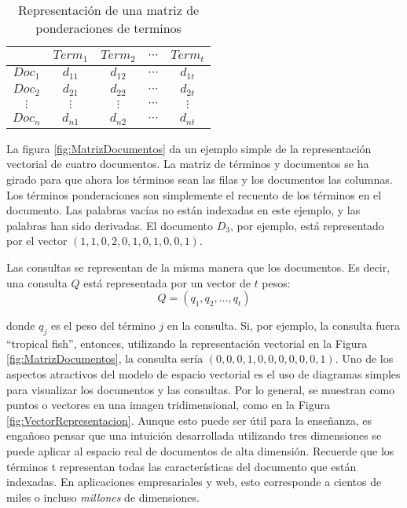 \begin{table}[H]
	\begin{center}
		\begin{tabular}{c|cccc}
			
			 & $Term_1$ & $Term_2$ & $\cdots$ & $Term_t$ \\ \hline
			$Doc_1$ & $d_{11}$ & $d_{12}$ & $\cdots$ & $d_{1t}$ \\ 
			$Doc_2$ & $d_{21}$ & $d_{22}$ & $\cdots$ & $d_{2t}$ \\ 
			$\vdots$ & $\vdots$ & $\vdots$ & $\cdots$ & $\vdots$ \\ 
			$Doc_n$ & $d_{n1}$ & $d_{n2}$ & $\cdots$ & $d_{nt}$ \\ \hline
		\end{tabular}
	\end{center}
	\caption{\label{tab:MatrizPonderacion}Representación de una matriz de ponderaciones de terminos}
\end{table}

La figura \ref{fig:MatrizDocumentos} da un ejemplo simple de la representación vectorial de cuatro documentos. La matriz de términos y documentos se ha girado para que ahora los términos sean las filas y los documentos las columnas. Los términos ponderaciones son simplemente el recuento de los términos en el documento. Las palabras vacías no están indexadas en este ejemplo, y las palabras han sido derivadas. El documento $D_3$, por ejemplo, está representado por el vector $(1, 1, 0, 2, 0, 1, 0, 1, 0, 0, 1)$.

Las consultas se representan de la misma manera que los documentos. Es decir, una consulta $Q$ está representada por un vector de $t$ pesos:
$$Q=(q_1,q_2,\dots ,q_t)$$

donde $q_j$ es el peso del término $j$ en la consulta. Si, por ejemplo, la consulta fuera ``tropical fish'', entonces, utilizando la representación vectorial en la Figura \ref{fig:MatrizDocumentos}, la consulta sería $(0, 0, 0, 1, 0, 0, 0, 0, 0, 0, 1)$. Uno de los aspectos atractivos del modelo de espacio vectorial es el uso de diagramas simples para visualizar los documentos y las consultas. Por lo general, se muestran como puntos o vectores en una imagen tridimensional, como en la Figura \ref{fig:VectorRepresentacion}. Aunque esto puede ser útil para la enseñanza, es engañoso pensar que una intuición desarrollada utilizando tres dimensiones se puede aplicar al espacio real de documentos de alta dimensión. Recuerde que los términos t representan todas las características del documento que están indexadas. En aplicaciones empresariales y web, esto corresponde a cientos de miles o incluso \textit{millones} de dimensiones.

